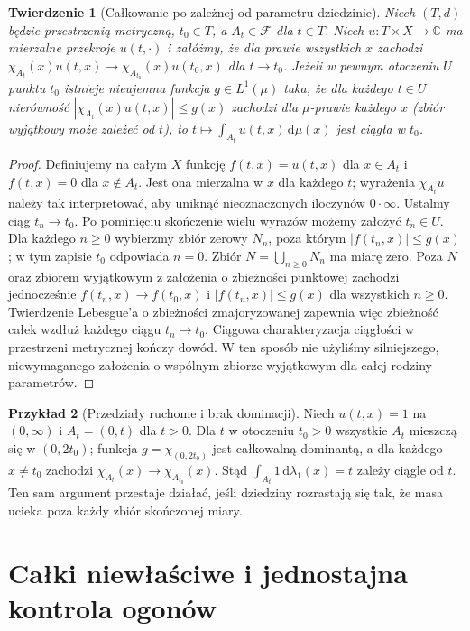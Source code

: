 \documentclass[11pt,a4paper,oneside]{book}
\numberwithin{equation}{chapter}
\theoremstyle{plain}
\newtheorem{twierdzenie}{Twierdzenie}[chapter]
\theoremstyle{definition}
\newtheorem{przyklad}[twierdzenie]{Przykład}
\theoremstyle{remark}
\begin{document}
\begin{twierdzenie}[Całkowanie po zależnej od parametru dziedzinie]
\label{thm:moving-domains-11}
Niech $(T,d)$ będzie przestrzenią metryczną, $t_0\in T$,
a $A_t\in\mathcal F$ dla $t\in T$. Niech $u:T\times X\to\mathbb C$
ma mierzalne przekroje $u(t,\cdot)$ i załóżmy, że dla prawie
wszystkich $x$ zachodzi
$\chi_{A_t}(x)u(t,x)\to\chi_{A_{t_0}}(x)u(t_0,x)$
dla $t\to t_0$. Jeżeli w pewnym otoczeniu $U$ punktu $t_0$
istnieje nieujemna funkcja $g\in L^1(\mu)$ taka, że
\emph{dla każdego} $t\in U$ nierówność
$|\chi_{A_t}(x)u(t,x)|\le g(x)$
zachodzi dla $\mu$-prawie każdego $x$ (zbiór wyjątkowy
może zależeć od $t$), to
$t\mapsto\int_{A_t}u(t,x)\,\mathrm d\mu(x)$
jest ciągła w $t_0$.
\end{twierdzenie}
\begin{proof}
Definiujemy na całym $X$ funkcję
$f(t,x)=u(t,x)$ dla $x\in A_t$ i $f(t,x)=0$
dla $x\notin A_t$. Jest ona mierzalna w $x$ dla każdego $t$;
wyrażenia $\chi_{A_t}u$ należy tak interpretować,
aby uniknąć nieoznaczonych iloczynów $0\cdot\infty$.
Ustalmy ciąg $t_n\to t_0$. Po pominięciu skończenie
wielu wyrazów możemy założyć $t_n\in U$. Dla każdego
$n\ge0$ wybierzmy zbiór zerowy $N_n$, poza którym
$|f(t_n,x)|\le g(x)$; w tym zapisie $t_0$ odpowiada
$n=0$. Zbiór $N=\bigcup_{n\ge0}N_n$ ma miarę zero.
Poza $N$ oraz zbiorem wyjątkowym z założenia o zbieżności
punktowej zachodzi jednocześnie $f(t_n,x)\to f(t_0,x)$
i $|f(t_n,x)|\le g(x)$ dla wszystkich $n\ge0$.
Twierdzenie Lebesgue'a o zbieżności zmajoryzowanej
zapewnia więc zbieżność całek wzdłuż każdego ciągu
$t_n\to t_0$. Ciągowa charakteryzacja ciągłości
w przestrzeni metrycznej kończy dowód. W ten sposób
nie użyliśmy silniejszego, niewymaganego założenia
o wspólnym zbiorze wyjątkowym dla całej rodziny parametrów.
\end{proof}

\begin{przyklad}[Przedziały ruchome i brak dominacji]
Niech $u(t,x)=1$ na $(0,\infty)$ i $A_t=(0,t)$ dla $t>0$.
Dla $t$ w otoczeniu $t_0>0$ wszystkie $A_t$ mieszczą się
w $(0,2t_0)$; funkcja $g=\chi_{(0,2t_0)}$ jest
całkowalną dominantą, a dla każdego $x\ne t_0$
zachodzi $\chi_{A_t}(x)\to\chi_{A_{t_0}}(x)$.
Stąd $\int_{A_t}1\,\mathrm d\lambda_1(x)=t$ zależy ciągle od $t$.
Ten sam argument przestaje działać, jeśli dziedziny rozrastają
się tak, że masa ucieka poza każdy zbiór skończonej miary.
\end{przyklad}

\section{Całki niewłaściwe i jednostajna kontrola ogonów}
\end{document}
